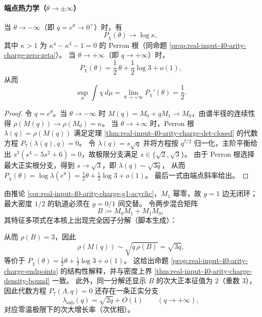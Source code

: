 \paragraph{端点热力学（$\theta\to\pm\infty$）}
\begin{proposition}[端点压力与极端电荷密度]\label{prop:real-input-40-arity-charge-endpoints}
当 $\theta\to-\infty$（即 $q=e^\theta\to 0^+$）时，有
\[
P_\chi(\theta)\to \log\kappa,
\]
其中 $\kappa>1$ 为 $\kappa^4-\kappa^3-1=0$ 的 Perron 根（同命题 \ref{prop:real-input-40-arity-charge-zero-zeta}）。
当 $\theta\to+\infty$（即 $q\to+\infty$）时，
\[
P_\chi(\theta)=\frac12\,\theta+\frac12\log 3+o(1),
\]
从而
\[
\sup_\mu\int\chi\,d\mu=\lim_{\theta\to+\infty}P_\chi'(\theta)=\frac12.
\]
\end{proposition}

\begin{proof}
令 $q=e^\theta$。当 $\theta\to-\infty$ 时 $M(q)=M_0+qM_1\to M_0$，由谱半径的连续性得
$\rho(M(q))\to\rho(M_0)=\kappa$。
当 $\theta\to+\infty$ 时，Perron 根 $\lambda(q)=\rho(M(q))$ 满足定理 \ref{thm:real-input-40-arity-charge-det-closed} 的代数方程
$P_7(\lambda(q),q)=0$。
令 $\lambda(q)=s\sqrt q$ 并将方程按 $q^{7/2}$ 归一化，主阶平衡给出
$s^3(s^4-5s^2+6)=0$，故极限分支满足 $s\in\{\sqrt2,\sqrt3\}$。
由于 Perron 根选择最大正实根分支，得到 $s\to\sqrt3$，即 $\lambda(q)\sim \sqrt{3q}$，
从而 $P_\chi(\theta)=\log\lambda(e^\theta)=\frac12\theta+\frac12\log 3+o(1)$。
最后一式由端点斜率给出。
\end{proof}

\begin{remark}[大偏置极限的组合机制]\label{rem:real-input-40-arity-charge-large-bias-mechanism}
由推论 \ref{cor:real-input-40-arity-charge-g1-acyclic}，$M_1$ 幂零，故 $g=1$ 边无闭环；
最大密度 $1/2$ 的轨道必须在 $g=0/1$ 间交替。
令两步混合矩阵
\[
B:=M_0M_1+M_1M_0,
\]
其特征多项式在本核上出现完全因子分解（脚本生成）：

从而 $\rho(B)=3$，因此
\[
\rho(M(q))\sim\sqrt{q\,\rho(B)}=\sqrt{3q},
\]
等价于 $P_\chi(\theta)=\frac12\theta+\frac12\log 3+o(1)$。
这给出命题 \ref{prop:real-input-40-arity-charge-endpoints} 的结构性解释，并与密度上界 \ref{thm:real-input-40-arity-charge-density-bound} 一致。
此外，同一分解还显示 \(B\) 的次大正本征值为 \(2\)（重数 \(3\)），因此代数方程 \(P_7(\Lambda,q)=0\) 还存在一条正实分支
\[
\lambda_{\mathrm{sub}}(q)=\sqrt{2q}+O(1)\qquad(q\to+\infty),
\]
对应零温极限下的次大增长率（次优相）。
\end{remark}

